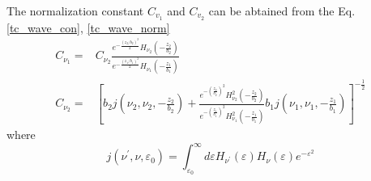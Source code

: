 The normalization constant $C_{v_1}$ and $C_{v_2}$ can be abtained from the Eq.\eqref{tc_wave_con}, \eqref{tc_wave_norm}
\begin{align}
C_{\nu_{1}}=&C_{\nu_{2}} \frac{e^{-\frac{\left(z_{2} / b_{2}\right)^{2} }{2}} H_{\nu_{2}}\left(-\frac{z_{2}}{b_{2}}\right)}{e^{-\frac{\left(z_{1} / b_{1}\right)^{2}}{2}} H_{\nu_{1}}\left(-\frac{z_{1}}{b_{1}}\right)}  \label{tc_Cv_1} \\
C_{\nu_{2}}=&\left[b_{2} j\left(\nu_{2}, \nu_{2},-\frac{z_{2}}{b_{2}}\right)+\frac{e^{-\left(\frac{z_{2}}{b_{2}}\right)^{2}} H_{\nu_{2}}^{2}\left(-\frac{z_{2}}{b_{2}}\right)}{e^{-\left(\frac{z_{1}}{b_{1}}\right)^{2}} H_{\nu_{1}}^{2}\left(-\frac{z_{1}}{b_{1}}\right)} b_{1} j\left(\nu_{1}, \nu_{1},-\frac{z_{1}}{b_{1}}\right)\right]^{-\frac{1}{2}}  \label{tc_Cv_2}
\end{align}
where
\begin{equation}
j(\nu^\prime, \nu, \varepsilon_0) = \int_{\varepsilon_0}^{\infty} d\varepsilon H_{\nu^\prime}(\varepsilon) H_{\nu}(\varepsilon) e^{-\varepsilon^2}  \label{tc_j_func}
\end{equation}
